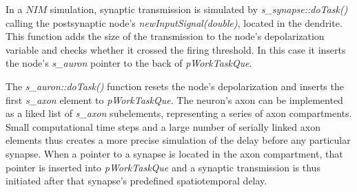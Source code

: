 			In a $NIM$ simulation, synaptic transmission is simulated by \emph{s\_synapse::doTask()} calling the postsynaptic node's \emph{newInputSignal(\emph{double})}, located in the dendrite. %
			This function adds the size of the transmission to the node's depolarization variable and checks whether it crossed the firing threshold.
			In this case it inserts the node's \emph{s\_auron} pointer to the back of \emph{pWorkTaskQue}.
			
			The \emph{s\_auron::doTask()} function resets the node's depolarization and inserts the first \emph{s\_axon} element to \emph{pWorkTaskQue}.
			The neuron's axon can be implemented as a liked list of \emph{s\_axon} subelements, representing a series of axon compartments.
			Small computational time steps and a large number of serially linked axon elements thus creates a more precise simulation of the delay before any particular synapse.
			When a pointer to a synapse is located in the axon compartment, that pointer is inserted into \emph{pWorkTaskQue} and a synaptic transmission is thus initiated after that synapse's predefined spatiotemporal delay.

